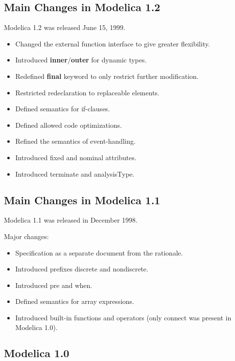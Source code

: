 \documentclass[10pt,a4paper]{report}
\def\doublelabel#1{\label{#1}}
\begin{document}
\subsection{Main Changes in Modelica 1.2}\doublelabel{main-changes-in-modelica-1-2}
Modelica 1.2 was released June 15, 1999.

\begin{itemize}
\item
  Changed the external function interface to give greater flexibility.
\item
  Introduced \textbf{inner}/\textbf{outer} for dynamic types.
\item
  Redefined \textbf{final} keyword to only restrict further
  modification.
\item
  Restricted redeclaration to replaceable elements.
\item
  Defined semantics for if-clauses.
\item
  Defined allowed code optimizations.
\item
  Refined the semantics of event-handling.
\item
  Introduced fixed and nominal attributes.
\item
  Introduced terminate and analysisType.
\end{itemize}

\subsection{Main Changes in Modelica 1.1}\doublelabel{main-changes-in-modelica-1-1}
Modelica 1.1 was released in December 1998.

Major changes:

\begin{itemize}
\item
  Specification as a separate document from the rationale.
\item
  Introduced prefixes discrete and nondiscrete.
\item
  Introduced pre and when.
\item
  Defined semantics for array expressions.
\item
  Introduced built-in functions and operators (only connect was present
  in Modelica 1.0).
\end{itemize}

\subsection{Modelica 1.0}\doublelabel{modelica-1-0}
\end{document}
